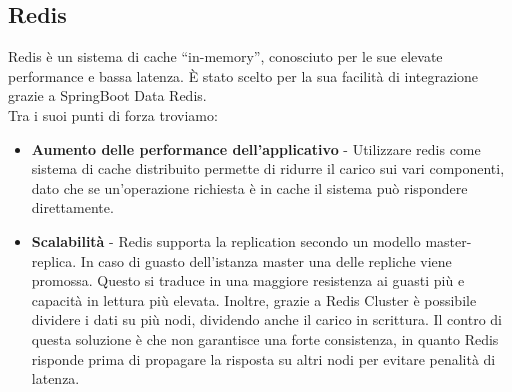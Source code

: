 \subsection{Redis}
Redis \`e un sistema di cache ``in-memory'', conosciuto per le sue elevate performance e bassa latenza.
\`E stato scelto per la sua facilit\`a di integrazione grazie a SpringBoot Data Redis.\\
Tra i suoi punti di forza troviamo:
\begin{itemize}
  \item \textbf{Aumento delle performance dell'applicativo} - Utilizzare redis come sistema di cache distribuito permette di ridurre il carico sui vari componenti,
    dato che se un'operazione richiesta \`e in cache il sistema pu\`o rispondere direttamente.
  \item \textbf{Scalabilit\`a} - Redis supporta la replication secondo un modello master-replica. In caso di guasto dell'istanza master una delle repliche
    viene promossa. Questo si traduce in una maggiore resistenza ai guasti pi\`u e capacit\`a in lettura pi\`u elevata.
    Inoltre, grazie a Redis Cluster \`e possibile dividere i dati su pi\`u nodi, dividendo anche il carico in scrittura. Il contro di questa soluzione \`e che non garantisce
    una forte consistenza, in quanto Redis risponde prima di propagare la risposta su altri nodi per evitare penalit\`a di latenza.
\end{itemize}

